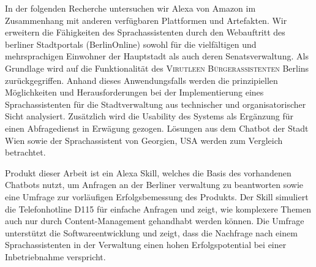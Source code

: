 In der folgenden Recherche untersuchen wir Alexa von Amazon im Zusammenhang mit anderen verfügbaren Plattformen und Artefakten. Wir erweitern die Fähigkeiten des Sprachassistenten durch den Webauftritt des berliner Stadtportals (BerlinOnline) %
sowohl für die vielfältigen und mehrsprachigen Einwohner der Hauptstadt als auch deren Senatsverwaltung. Als Grundlage wird auf die Funktionalität des  %
	\textsc{Virutleen Bürgerassistenten} Berlins
zurückgegriffen. Anhand dieses Anwendungsfalls werden die prinzipiellen Möglichkeiten und Herausforderungen bei der Implementierung eines Sprachassistenten für die Stadtverwaltung aus technischer und organisatorischer Sicht analysiert. Zusätzlich wird die Usability des Systems als Ergänzung für einen Abfragedienst in Erwägung gezogen. %
Lösungen aus dem Chatbot der Stadt Wien sowie der Sprachassistent von Georgien, USA werden zum Vergleich betrachtet.


Produkt dieser Arbeit ist ein Alexa Skill, welches die Basis des vorhandenen Chatbots nutzt, um Anfragen an der Berliner verwaltung zu beantworten sowie eine Umfrage zur vorläufigen Erfolgsbemessung des Produkts. Der Skill simuliert die Telefonhotline D115 für einfache Anfragen und zeigt, wie komplexere Themen auch nur durch Content-Management gehandhabt werden können. Die Umfrage unterstützt die Softwareentwicklung und zeigt, dass die Nachfrage nach einem Sprachassistenten in der Verwaltung einen hohen Erfolgspotential bei einer Inbetriebnahme verspricht. 









